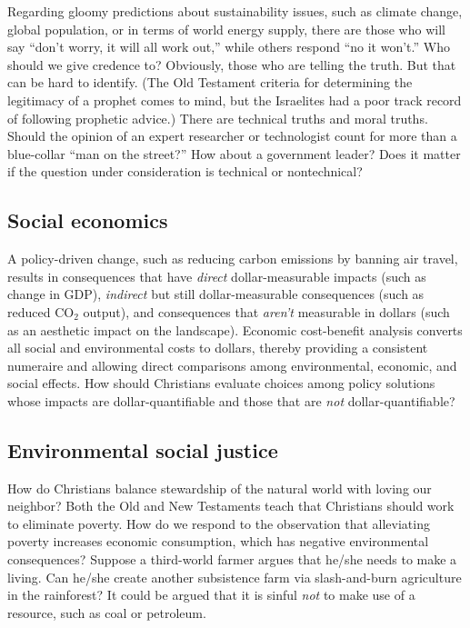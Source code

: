 \documentclass[12pt]{article}
\begin{document}
Regarding gloomy predictions about sustainability issues, such as climate change, global population,
or in terms of world energy supply, there are those who will say ``don't worry, it will all work out,'' while
others respond ``no it won't.'' Who should we give credence to? Obviously, those who are telling the truth. But that can
be hard to identify. (The Old Testament criteria for determining the legitimacy of a prophet comes to mind, but the
Israelites had a poor track record of following prophetic advice.) There are technical truths and moral truths. Should
the opinion of an expert researcher or technologist count for more than a blue-collar ``man on the street?'' How about a
government leader? Does it matter if the question under consideration is technical or nontechnical?

\subsection{Social economics}

A policy-driven change, such as reducing carbon emissions by banning air travel, results in consequences that have
\emph{direct} dollar-measurable impacts (such as change in GDP), \emph{indirect} but still dollar-measurable
consequences (such as reduced CO$_2$ output), and consequences that \emph{aren't} measurable in dollars (such as an
aesthetic impact on the landscape). Economic cost-benefit analysis converts all social and environmental costs to
dollars, thereby providing a consistent numeraire and allowing direct comparisons among environmental, economic, and
social effects. How should Christians evaluate choices among policy solutions whose impacts are dollar-quantifiable and
those that are \emph{not} dollar-quantifiable? 

\subsection{Environmental social justice}
How do Christians balance stewardship of the natural world with loving our neighbor?
Both the Old and New Testaments teach that Christians should work to eliminate poverty. 
How do we respond to the observation that alleviating poverty increases economic consumption, which has negative environmental consequences?
Suppose a third-world farmer argues that he/she needs to make a living. 
Can he/she create another subsistence farm via slash-and-burn agriculture in the rainforest?  
It could be argued that it is sinful \emph{not} to make use of a resource, such as coal or petroleum. 
\end{document}
